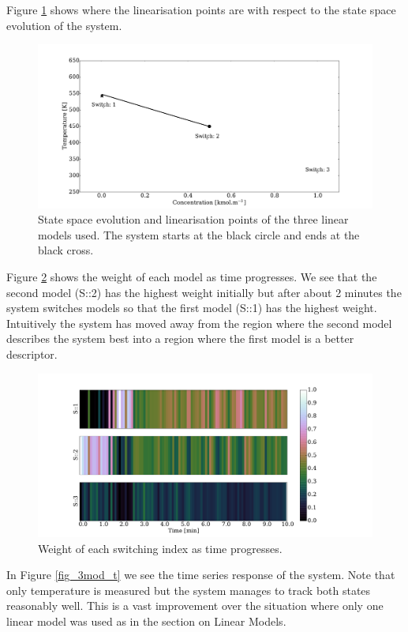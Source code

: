 \documentclass[../masters.tex]{subfiles}
\begin{document}
Figure \ref{fig_3mod_ss} shows where the linearisation points are with respect to the state space evolution of the system.
\begin{figure}[H] 
\centering
\includegraphics[scale=0.3]{skf_s3_s.pdf}
\caption{State space evolution and linearisation points of the three linear models used. The system starts at the black circle and ends at the black cross.}
\label{fig_3mod_ss}
\end{figure}
Figure \ref{fig_3mod_w} shows the weight of each model as time progresses. We see that the second model (S::2) has the highest weight initially but after about 2 minutes the system switches models so that the first model (S::1) has the highest weight. Intuitively the system has moved away from the region where the second model describes the system best into a region where the first model is a better descriptor. 
\begin{figure}[H] 
\centering
\includegraphics[scale=0.3]{skf_s3_w.pdf}
\caption{Weight of each switching index as time progresses.}
\label{fig_3mod_w}
\end{figure}
In Figure \ref{fig_3mod_t} we see the time series response of the system. Note that only temperature is measured but the system manages to track both states reasonably well. This is a vast improvement over the situation where only one linear model was used as in the section on Linear Models.
\end{document}
